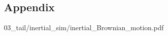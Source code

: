 \newpage
\begin{appendix}
\renewcommand{\thesection}{\Alph{section}}
\renewcommand{\appendixname}{Appendix}
\renewcommand{\thesubsection}{\thesection.\arabic{subsection}}
\renewcommand\thefigure{\thesection.\arabic{figure}}
\renewcommand\thetable{\thesection.\arabic{table}}
\setcounter{table}{0}
\setcounter{figure}{0}


\section{Appendix}


{03_tail/inertial_sim/inertial_Brownian_motion.pdf}



\end{appendix}
